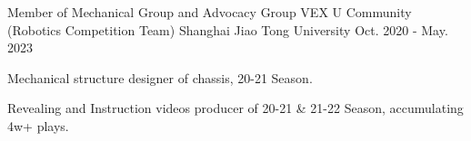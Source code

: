 

\begin{cventries}

    \cventry
    {Member of Mechanical Group and Advocacy Group} %
    {VEX U Community (Robotics Competition Team)} %
    {Shanghai Jiao Tong University} %
    {Oct. 2020 - May. 2023} %
    {
      \begin{cvitems} %
      \item Mechanical structure designer of chassis, 20-21 Season.
      \item Revealing and Instruction videos producer of 20-21 \& 21-22 Season, accumulating 4w+ plays.
      \end{cvitems}
    }
    
    

\end{cventries}
